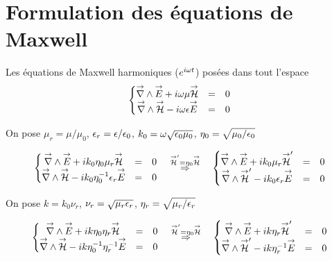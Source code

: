 \section{Formulation des équations de Maxwell}

Les équations de Maxwell harmoniques (\(e^{i\w t}\)) posées dans tout l'espace
\begin{equation}
  \left\lbrace \begin{matrix}
  \vrot \vE + i\w\mu \vH &=& 0 \\
  \vrot \vH - i\w\eps \vE &=& 0 \\
  \end{matrix} \right.
\end{equation}

On pose \(\mu_r = \mu \slash \mu_0\), \(\eps_r = \eps \slash \eps_0\), \(k_0 = \w \sqrt {\eps_0\mu_0}\), \(\eta_0=\sqrt {\mu_0/\eps_0}\)

\begin{equation}
\left\lbrace \begin{matrix}
\vrot \vE + ik_0\eta_0\mu_r \vH &=& 0 \\
\vrot \vH - ik_0\eta_0^{-1}\eps_r \vE &=& 0 \\
\end{matrix} \right.
\quad
\overset{\vH' = \eta_0 \vH}{\Rightarrow}
\quad
\left\lbrace \begin{matrix}
\vrot \vE + ik_0\mu_r \vH' &=& 0 \\
\vrot \vH' - ik_0\eps_r \vE &=& 0 \\
\end{matrix} \right.
\end{equation}

On pose \(k=k_0\nu_r\), \(\nu_r = \sqrt{\mu_r\eps_r}\), \(\eta_r = \sqrt{\mu_r \slash \eps_r}\)

\begin{equation}
\left\lbrace \begin{matrix}
\vrot \vE + ik\eta_0\eta_r \vH &=& 0 \\
\vrot \vH - ik\eta_0^{-1}\eta_r^{-1} \vE &=& 0 \\
\end{matrix} \right.
\quad
\overset{\vH' = \eta_0 \vH}{\Rightarrow}
\quad
\left\lbrace \begin{matrix}
\vrot \vE + ik\eta_r \vH' &=& 0 \\
\vrot \vH' - ik\eta_r^{-1} \vE &=& 0 \\
\end{matrix} \right.
\end{equation}